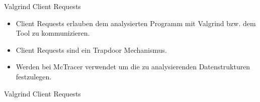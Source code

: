 \begin{frame}{Valgrind Client Requests}
	\begin{itemize}
		\item Client Requests erlauben dem analysierten Programm mit Valgrind bzw. dem Tool zu kommunizieren.
		\pause \item Client Requests sind ein Trapdoor Mechanismus.
		\pause \item Werden bei McTracer verwendet um die zu analysierenden Datenstrukturen festzulegen.
	\end{itemize}

	\pause

	\lstset{frame=single}
	
\end{frame}

\begin{frame}{Valgrind Client Requests}
	\lstset{frame=single}
		
\end{frame}
